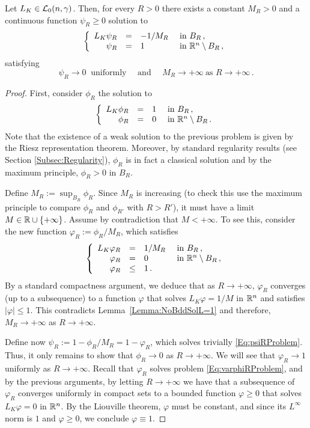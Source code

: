 \begin{lemma}
	\label{Lemma:SolBallToZero}
	Let $L_K \in \mathcal{L}_0(n,\gamma)$. Then, for every $R>0$ there exists a constant $M_R>0$ and a continuous function $\psi_R\geq 0$ solution to
	\begin{equation}
	\label{Eq:psiRProblem}
	\left\{\begin{array}{rcll}
	L_K  \psi_R &=& -1/M_R & \textrm{ in } B_R\,,\\
	\psi_R &=& 1 & \textrm{ in } \mathbb{R}^n\setminus B_R\,,
	\end{array} \right.
	\end{equation}
	satisfying 
	$$
	 \psi_R \to  0 \ \text{ uniformly } \quad \text{and } \quad M_R  \to +\infty \ \text{as } R\to +\infty\,.
	$$
\end{lemma}

\begin{proof}
	First, consider $\phi_R$ the solution to
	\begin{equation*}
	\left\{\begin{array}{rcll}
	L_K  \phi_R &=& 1 & \textrm{ in } B_R\,,\\
	\phi_R &=& 0 & \textrm{ in } \mathbb{R}^n\setminus B_R\,.
	\end{array} \right.
	\end{equation*}
	Note that the existence of a weak solution to the previous problem is given by the Riesz representation theorem. Moreover, by standard regularity results (see Section \ref{Subsec:Regularity}), $\phi_R$ is in fact a classical solution and by the maximum principle, $\phi_R>0$ in $B_R$.
	
	Define $M_R := \sup_{B_R} \phi_R$. Since $M_R$ is increasing (to check this use the maximum principle to compare $\phi_R$ and $\phi_{R'}$ with $R>R'$), it must have a limit $M\in \mathbb{R} \cup \{+\infty\}$. Assume by contradiction that $M<+\infty$. To see this, consider the new function $ \varphi_R := \phi_R/M_R$, which satisfies
	\begin{equation}
	\label{Eq:varphiRProblem}
	\left\{\begin{array}{rcll}
	L_K  \varphi_R &=& 1/M_R & \textrm{ in } B_R\,,\\
	\varphi_R &=& 0 & \textrm{ in } \mathbb{R}^n\setminus B_R\,, \\
	\varphi_R &\leq & 1\,.
	\end{array} \right.
	\end{equation}
	By a standard compactness argument, we deduce that as $R\to +\infty$, $\varphi_R$ converges (up to a subsequence) to a function $\varphi$ that solves $L_K  \varphi = 1/M$ in $\mathbb{R}^n$ and satisfies  $|\varphi| \leq 1$. This contradicts Lemma~\ref{Lemma:NoBddSolL=1} and therefore, $M_R \to +\infty$ as $R\to +\infty$. 
	
	Define now $\psi_R := 1-\phi_R/M_R = 1-\varphi_R$, which solves trivially \eqref{Eq:psiRProblem}. Thus, it only remains to show that $\phi_R \to 0$ as $R\to +\infty$. We will see that $\varphi_R \to	1$ uniformly as $R\to +\infty$. Recall that $\varphi_R$ solves problem \eqref{Eq:varphiRProblem}, and by the previous arguments, by letting $R\to +\infty$ we have that a subsequence of $\varphi_R$ converges uniformly in compact sets to a bounded function $\varphi\geq 0$ that solves $ L_K \varphi = 0 $ in $\mathbb{R}^n$. By the Liouville theorem, $\varphi$ must be constant, and since its $L^\infty$ norm is $1$ and $\varphi\geq 0$, we conclude $\varphi\equiv 1$.	
\end{proof}

